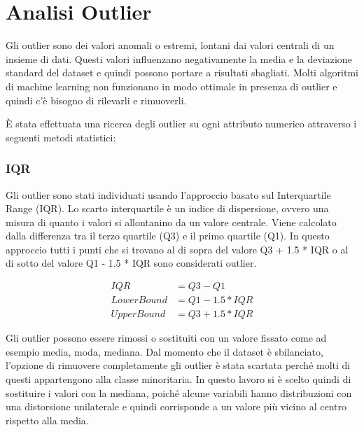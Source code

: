 \section{Analisi Outlier}
Gli outlier sono dei valori anomali o estremi, lontani dai valori centrali di un insieme di dati. Questi valori influenzano negativamente la media e la deviazione standard del dataset e quindi possono portare a risultati sbagliati. Molti algoritmi di machine learning non funzionano in modo ottimale in presenza di outlier e quindi c'è bisogno di rilevarli e rimuoverli.

\vspace{4mm}
\noindent
\`{E} stata effettuata una ricerca degli outlier su ogni attributo numerico attraverso i seguenti metodi statistici:

\subsubsection{IQR}
Gli outlier sono stati individuati usando l'approccio basato sul Interquartile Range (IQR). Lo scarto interquartile è un indice di dispersione, ovvero una misura di quanto i valori si allontanino da un valore centrale. Viene calcolato dalla differenza tra il terzo quartile (Q3) e il primo quartile (Q1). In questo approccio tutti i punti che si trovano al di sopra del valore Q3 + 1.5 * IQR o al di sotto del valore Q1 - 1.5 * IQR sono considerati outlier.

\begin{align*}
    IQR         & = Q3 - Q1        \\
    Lower Bound & = Q1 - 1.5 * IQR \\
    Upper Bound & = Q3 + 1.5 * IQR
\end{align*}

\noindent
Gli outlier possono essere rimossi o sostituiti con un valore fissato come ad esempio media, moda, mediana.
Dal momento che il dataset è sbilanciato, l'opzione di rimuovere completamente gli outlier è stata scartata perché molti di questi appartengono alla classe minoritaria.
In questo lavoro si è scelto quindi di sostituire i valori con la mediana, poiché alcune variabili hanno distribuzioni con una distorsione unilaterale e quindi corrisponde a un valore più vicino al centro rispetto alla media.

